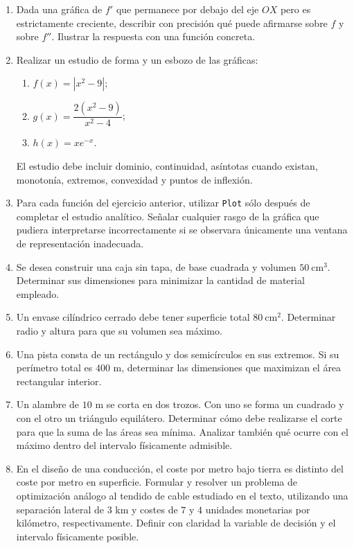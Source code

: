 \begin{enumerate}[label=\textbf{\arabic*.},leftmargin=*]
\item Dada una gráfica de $f'$ que permanece por debajo del eje $OX$ pero es estrictamente creciente, describir con precisión qué puede afirmarse sobre $f$ y sobre $f''$. Ilustrar la respuesta con una función concreta.

\item Realizar un estudio de forma y un esbozo de las gráficas:
\begin{enumerate}[label=\alph*)]
\item $f(x)=|x^2-9|$;
\item $g(x)=\dfrac{2(x^2-9)}{x^2-4}$;
\item $h(x)=xe^{-x}$.
\end{enumerate}
El estudio debe incluir dominio, continuidad, asíntotas cuando existan, monotonía, extremos, convexidad y puntos de inflexión.

\item \M Para cada función del ejercicio anterior, utilizar \texttt{Plot} sólo después de completar el estudio analítico. Señalar cualquier rasgo de la gráfica que pudiera interpretarse incorrectamente si se observara únicamente una ventana de representación inadecuada.

\item Se desea construir una caja sin tapa, de base cuadrada y volumen $50\ \mathrm{cm}^3$. Determinar sus dimensiones para minimizar la cantidad de material empleado.

\item Un envase cilíndrico cerrado debe tener superficie total $80\ \mathrm{cm}^2$. Determinar radio y altura para que su volumen sea máximo.

\item Una pista consta de un rectángulo y dos semicírculos en sus extremos. Si su perímetro total es $400$ m, determinar las dimensiones que maximizan el área rectangular interior.

\item Un alambre de $10$ m se corta en dos trozos. Con uno se forma un cuadrado y con el otro un triángulo equilátero. Determinar cómo debe realizarse el corte para que la suma de las áreas sea mínima. Analizar también qué ocurre con el máximo dentro del intervalo físicamente admisible.

\item En el diseño de una conducción, el coste por metro bajo tierra es distinto del coste por metro en superficie. Formular y resolver un problema de optimización análogo al tendido de cable estudiado en el texto, utilizando una separación lateral de $3$ km y costes de $7$ y $4$ unidades monetarias por kilómetro, respectivamente. Definir con claridad la variable de decisión y el intervalo físicamente posible.


\end{enumerate}
